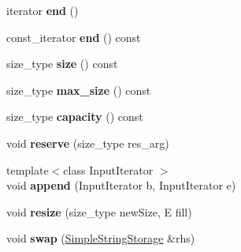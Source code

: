 \begin{DoxyCompactItemize}
\item 
\hypertarget{classSimpleStringStorage_a20b484b5d842527ad8a4fbc8b3e63bc9}{}iterator {\bfseries end} ()\label{classSimpleStringStorage_a20b484b5d842527ad8a4fbc8b3e63bc9}

\item 
\hypertarget{classSimpleStringStorage_a35984d51017389859d4f6e513062f235}{}const\+\_\+iterator {\bfseries end} () const \label{classSimpleStringStorage_a35984d51017389859d4f6e513062f235}

\item 
\hypertarget{classSimpleStringStorage_a74d4816c49eb4ce287979891a7da4d77}{}size\+\_\+type {\bfseries size} () const \label{classSimpleStringStorage_a74d4816c49eb4ce287979891a7da4d77}

\item 
\hypertarget{classSimpleStringStorage_a8b75af38a10b7f88a2186144b1618628}{}size\+\_\+type {\bfseries max\+\_\+size} () const \label{classSimpleStringStorage_a8b75af38a10b7f88a2186144b1618628}

\item 
\hypertarget{classSimpleStringStorage_a75b012b16f8878d49a7bffc850d848f6}{}size\+\_\+type {\bfseries capacity} () const \label{classSimpleStringStorage_a75b012b16f8878d49a7bffc850d848f6}

\item 
\hypertarget{classSimpleStringStorage_a32d636dae9d36c51b0d309f9fb497301}{}void {\bfseries reserve} (size\+\_\+type res\+\_\+arg)\label{classSimpleStringStorage_a32d636dae9d36c51b0d309f9fb497301}

\item 
\hypertarget{classSimpleStringStorage_a49ff6abf000601a6e222cff36e89c36b}{}{\footnotesize template$<$class Input\+Iterator $>$ }\\void {\bfseries append} (Input\+Iterator b, Input\+Iterator e)\label{classSimpleStringStorage_a49ff6abf000601a6e222cff36e89c36b}

\item 
\hypertarget{classSimpleStringStorage_a95adf2487bbe4f3dd12c8cb77c1ed195}{}void {\bfseries resize} (size\+\_\+type new\+Size, E fill)\label{classSimpleStringStorage_a95adf2487bbe4f3dd12c8cb77c1ed195}

\item 
\hypertarget{classSimpleStringStorage_ad3593fc42bed7add06c6dcfeacb00ff1}{}void {\bfseries swap} (\hyperlink{classSimpleStringStorage}{Simple\+String\+Storage} \&rhs)\label{classSimpleStringStorage_ad3593fc42bed7add06c6dcfeacb00ff1}


\end{DoxyCompactItemize}
